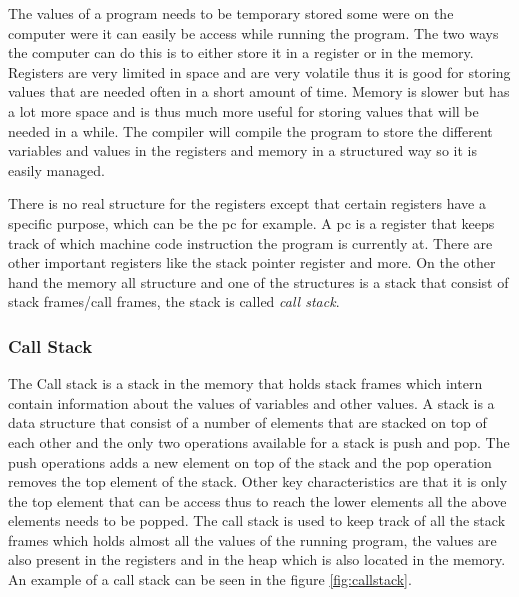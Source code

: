  

The values of a program needs to be temporary stored some were on the computer were it can easily be access while running the program.
The two ways the computer can do this is to either store it in a register or in the memory.
Registers are very limited in space and are very volatile thus it is good for storing values that are needed often in a short amount of time.
Memory is slower but has a lot more space and is thus much more useful for storing values that will be needed in a while.
The compiler will compile the program to store the different variables and values in the registers and memory in a structured way so it is easily managed.

There is no real structure for the registers except that certain registers have a specific purpose, which can be the \gls{pc} for example.
A \gls{pc} is a register that keeps track of which machine code instruction the program is currently at.
There are other important registers like the stack pointer register and more.
On the other hand the memory all structure and one of the structures is a stack that consist of stack frames/call frames, the stack is called \emph{call stack}.


\subsubsection{Call Stack}
The Call stack is a stack in the memory that holds stack frames which intern contain information about the values of variables and other values.
A stack is a data structure that consist of a number of elements that are stacked on top of each other and the only two operations available for a stack is push and pop.
The push operations adds a new element on top of the stack and the pop operation removes the top element of the stack.
Other key characteristics are that it is only the top element that can be access thus to reach the lower elements all the above elements needs to be popped.
The call stack is used to keep track of all the stack frames which holds almost all the values of the running program, the values are also present in the registers and in the heap which is also located in the memory.
An example of a call stack can be seen in the figure \ref{fig:callstack}.


